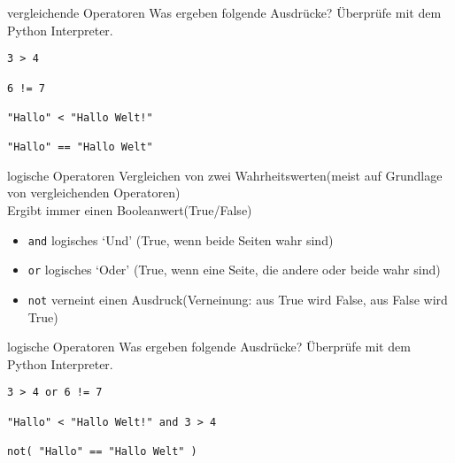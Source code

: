 \begin{frame}[fragile]{vergleichende Operatoren}
Was ergeben folgende Ausdrücke? Überprüfe mit dem Python Interpreter.

\begin{lstlisting} 
3 > 4 

6 != 7

"Hallo" < "Hallo Welt!" 

"Hallo" == "Hallo Welt"

\end{lstlisting}
\end{frame}



\begin{frame}[fragile]{logische Operatoren}
Vergleichen von zwei Wahrheitswerten(meist auf Grundlage von vergleichenden Operatoren)\\
Ergibt immer einen Booleanwert(True/False)

\begin{itemize}	
\item \texttt{and}  logisches `Und' (True, wenn beide Seiten wahr sind)
\item \texttt{or}  logisches `Oder' (True, wenn eine Seite, die andere oder beide wahr sind)
\item \texttt{not}  verneint einen Ausdruck(Verneinung: aus True wird False, aus False wird True)
\end{itemize}
\end{frame}

\begin{frame}[fragile]{logische Operatoren}
Was ergeben folgende Ausdrücke? Überprüfe mit dem Python Interpreter.

\begin{lstlisting} 
3 > 4 or 6 != 7

"Hallo" < "Hallo Welt!" and 3 > 4

not( "Hallo" == "Hallo Welt" )
\end{lstlisting}
\end{frame}







